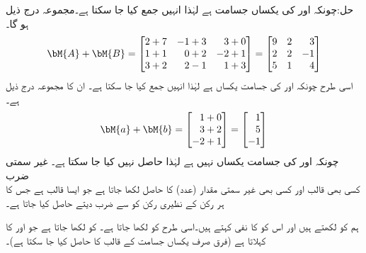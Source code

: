 حل:چونکہ  اور  کی یکساں جسامت ہے لہٰذا انہیں جمع کیا جا سکتا ہے۔مجموعہ درج ذیل ہو گا۔
\begin{align*}
\bM{A}+\bM{B}=
\begin{bmatrix*}[r]
2+7&-1+3&3+0\\
1+1&0+2&-2+1\\
3+2&2-1&1+3
\end{bmatrix*}
=
\begin{bmatrix*}[r]
9&2&3\\
2&2&-1\\
5&1&4
\end{bmatrix*}
\end{align*}
اسی طرح چونکہ  اور  کی جسامت یکساں ہے لہٰذا انہیں جمع  کیا جا سکتا ہے۔ ان کا مجموعہ درج ذیل ہے۔
\begin{align*}
\bM{a}+\bM{b}=
\begin{bmatrix*}[r]
1+0\\
3+2\\
-2+1
\end{bmatrix*}=
\begin{bmatrix*}[r]
1\\
5\\
-1
\end{bmatrix*}
\end{align*}
چونکہ  اور  کی جسامت یکساں نہیں ہے لہٰذا  حاصل نہیں کیا جا سکتا ہے۔
\quad غیر سمتی ضرب\\
کسی بھی  قالب  اور کسی بھی غیر سمتی مقدار (عدد)  کا حاصل   لکھا جاتا ہے جو ایسا  قالب  ہے جس کا ہر رکن  کے نظیری رکن کو  سے ضرب دیتے حاصل کیا جاتا ہے۔

ہم  کو  لکھتے ہیں اور اس کو  کا نفی کہتے ہیں۔اسی طرح  کو  لکھا جاتا ہے۔  کو  لکھا جاتا ہے جو  اور  کا  کہلاتا ہے (فرق صرف یکساں جسامت کے قالب کا حاصل کیا جا سکتا ہے)۔

